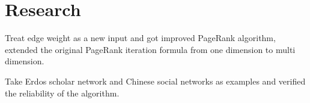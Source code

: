 \documentclass[letterpaper]{deedy-resume} %
\begin{document}
\begin{minipage}[t]{0.66\textwidth}



\section{Research}

\descript{}

\vspace{\topsep} %
\begin{tightitemize}
	\item Treat edge weight as a new input and got improved PageRank algorithm, extended the original PageRank iteration formula from one dimension to multi dimension.
	\item Take Erdos scholar network and Chinese social networks as examples and verified the reliability of the algorithm.
\end{tightitemize}



%
%


\end{minipage}
\end{document}
